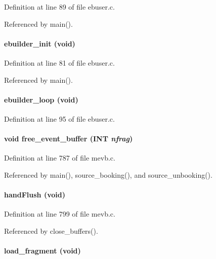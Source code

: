Definition at line 89 of file ebuser.c.

Referenced by main().
\paragraph[{ebuilder\_\-init}]{ ebuilder\_\-init (void)}\hfill\label{mevb_8c_aaa366445f644177970cb424a96623769}


Definition at line 81 of file ebuser.c.

Referenced by main().
\paragraph[{ebuilder\_\-loop}]{ ebuilder\_\-loop (void)}\hfill\label{mevb_8c_a9507ec9b5b35bd9f7f92c16aa183ccd9}


Definition at line 95 of file ebuser.c.
\paragraph[{free\_\-event\_\-buffer}]{\setlength{\rightskip}{0pt plus 5cm}void free\_\-event\_\-buffer ({\bf INT} {\em nfrag})}\hfill\label{mevb_8c_a3d3a2bd919d3f50f2f7473d15ee43dc0}


Definition at line 787 of file mevb.c.

Referenced by main(), source\_\-booking(), and source\_\-unbooking().
\paragraph[{handFlush}]{ handFlush (void)}\hfill\label{mevb_8c_a6395f2a900d9448058797454509af451}


Definition at line 799 of file mevb.c.

Referenced by close\_\-buffers().
\paragraph[{load\_\-fragment}]{ load\_\-fragment (void)}\hfill\label{mevb_8c_aab6feb9327461cbb6493302aefb17412}


